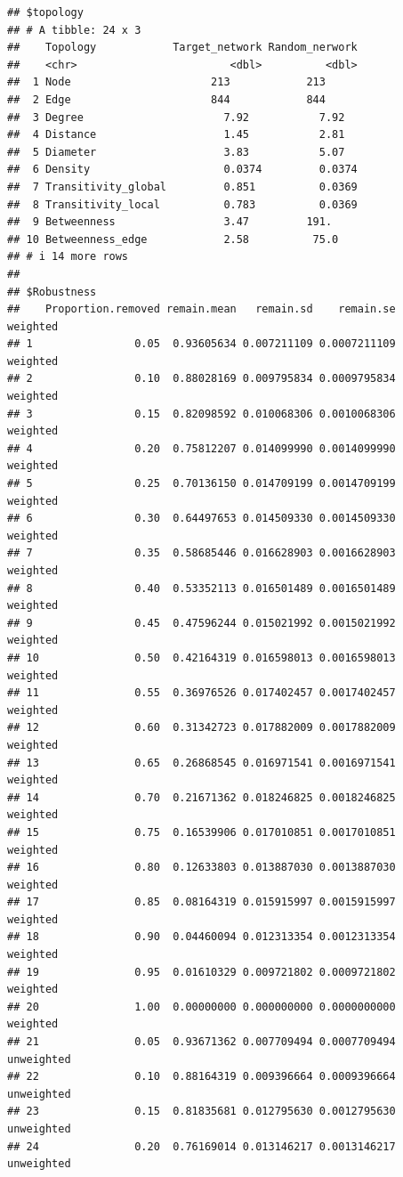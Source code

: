 \documentclass[
]{book}
\begin{document}
\begin{verbatim}
## $topology
## # A tibble: 24 x 3
##    Topology            Target_network Random_nerwork
##    <chr>                        <dbl>          <dbl>
##  1 Node                      213            213     
##  2 Edge                      844            844     
##  3 Degree                      7.92           7.92  
##  4 Distance                    1.45           2.81  
##  5 Diameter                    3.83           5.07  
##  6 Density                     0.0374         0.0374
##  7 Transitivity_global         0.851          0.0369
##  8 Transitivity_local          0.783          0.0369
##  9 Betweenness                 3.47         191.    
## 10 Betweenness_edge            2.58          75.0   
## # i 14 more rows
## 
## $Robustness
##    Proportion.removed remain.mean   remain.sd    remain.se   weighted
## 1                0.05  0.93605634 0.007211109 0.0007211109   weighted
## 2                0.10  0.88028169 0.009795834 0.0009795834   weighted
## 3                0.15  0.82098592 0.010068306 0.0010068306   weighted
## 4                0.20  0.75812207 0.014099990 0.0014099990   weighted
## 5                0.25  0.70136150 0.014709199 0.0014709199   weighted
## 6                0.30  0.64497653 0.014509330 0.0014509330   weighted
## 7                0.35  0.58685446 0.016628903 0.0016628903   weighted
## 8                0.40  0.53352113 0.016501489 0.0016501489   weighted
## 9                0.45  0.47596244 0.015021992 0.0015021992   weighted
## 10               0.50  0.42164319 0.016598013 0.0016598013   weighted
## 11               0.55  0.36976526 0.017402457 0.0017402457   weighted
## 12               0.60  0.31342723 0.017882009 0.0017882009   weighted
## 13               0.65  0.26868545 0.016971541 0.0016971541   weighted
## 14               0.70  0.21671362 0.018246825 0.0018246825   weighted
## 15               0.75  0.16539906 0.017010851 0.0017010851   weighted
## 16               0.80  0.12633803 0.013887030 0.0013887030   weighted
## 17               0.85  0.08164319 0.015915997 0.0015915997   weighted
## 18               0.90  0.04460094 0.012313354 0.0012313354   weighted
## 19               0.95  0.01610329 0.009721802 0.0009721802   weighted
## 20               1.00  0.00000000 0.000000000 0.0000000000   weighted
## 21               0.05  0.93671362 0.007709494 0.0007709494 unweighted
## 22               0.10  0.88164319 0.009396664 0.0009396664 unweighted
## 23               0.15  0.81835681 0.012795630 0.0012795630 unweighted
## 24               0.20  0.76169014 0.013146217 0.0013146217 unweighted

\end{verbatim}
\end{document}
